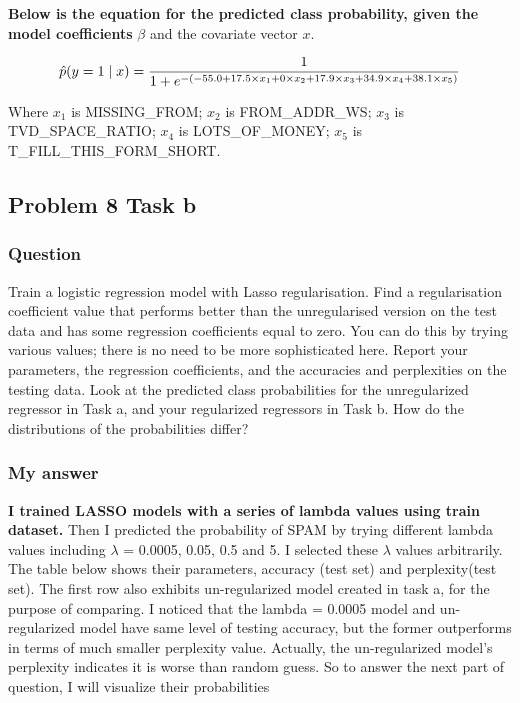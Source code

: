 \documentclass[
]{article}
\begin{document}
\textbf{Below is the equation for the predicted class probability, given
the model coeﬀicients} \(\beta\) and the covariate vector \(x\).

\[
\hat{p}(y = 1 \mid x) = \frac{1}{1 + e^{-(-55.0 + 17.5 \times x_1 + 0 \times x_2+ 17.9 \times x_3 + 34.9 \times x_4 + 38.1 \times x_5)}} \\
\]

Where \(x_1\) is MISSING\_FROM; \(x_2\) is FROM\_ADDR\_WS; \(x_3\) is
TVD\_SPACE\_RATIO; \(x_4\) is LOTS\_OF\_MONEY; \(x_5\) is
T\_FILL\_THIS\_FORM\_SHORT.

\hypertarget{problem-8-task-b}{%
\subsection{Problem 8 Task b}\label{problem-8-task-b}}

\hypertarget{question-1}{%
\subsubsection{Question}\label{question-1}}

Train a logistic regression model with Lasso regularisation. Find a
regularisation coeﬀicient value that performs better than the
unregularised version on the test data and has some regression
coeﬀicients equal to zero. You can do this by trying various values;
there is no need to be more sophisticated here. Report your parameters,
the regression coeﬀicients, and the accuracies and perplexities on the
testing data. Look at the predicted class probabilities for the
unregularized regressor in Task a, and your regularized regressors in
Task b. How do the distributions of the probabilities differ?

\hypertarget{my-answer-1}{%
\subsubsection{My answer}\label{my-answer-1}}

\textbf{I trained LASSO models with a series of lambda values using
train dataset.} Then I predicted the probability of SPAM by trying
different lambda values including \(\lambda\) = 0.0005, 0.05, 0.5 and 5.
I selected these \(\lambda\) values arbitrarily. The table below shows
their parameters, accuracy (test set) and perplexity(test set). The
first row also exhibits un-regularized model created in task a, for the
purpose of comparing. I noticed that the lambda = 0.0005 model and
un-regularized model have same level of testing accuracy, but the former
outperforms in terms of much smaller perplexity value. Actually, the
un-regularized model's perplexity indicates it is worse than random
guess. So to answer the next part of question, I will visualize their
probabilities
\end{document}

